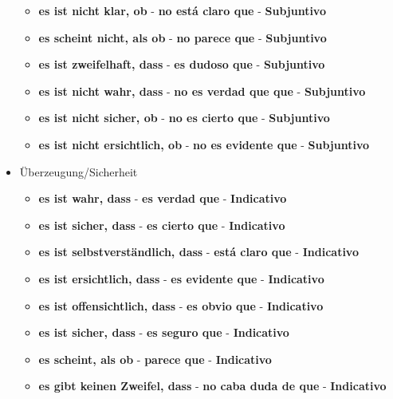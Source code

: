 \documentclass{article}
\begin{document}
\begin{multicols}{2}
\begin{itemize}
\begin{itemize}
			\item{\textbf{es ist nicht klar, ob} - \textbf{no está claro que} - \textbf{Subjuntivo}}
			\item{\textbf{es scheint nicht, als ob} - \textbf{no parece que} - \textbf{Subjuntivo}}
			\item{\textbf{es ist zweifelhaft, dass} - \textbf{es dudoso que} - \textbf{Subjuntivo}}
			\item{\textbf{es ist nicht wahr, dass} - \textbf{no es verdad que que} - \textbf{Subjuntivo}}
			\item{\textbf{es ist nicht sicher, ob} - \textbf{no es cierto que} - \textbf{Subjuntivo}}
			\item{\textbf{es ist nicht ersichtlich, ob} - \textbf{no es evidente que} - \textbf{Subjuntivo}}

		\end{itemize}
		\item{Überzeugung/Sicherheit}
		\begin{itemize}
			\item{\textbf{es ist wahr, dass} - \textbf{es verdad que} - \textbf{Indicativo}}
			\item{\textbf{es ist sicher, dass} - \textbf{es cierto que} - \textbf{Indicativo}}
			\item{\textbf{es ist selbstverständlich, dass} - \textbf{está claro que} - \textbf{Indicativo}}
			\item{\textbf{es ist ersichtlich, dass} - \textbf{es evidente que} - \textbf{Indicativo}}
			\item{\textbf{es ist offensichtlich, dass} - \textbf{es obvio que} - \textbf{Indicativo}}
			\item{\textbf{es ist sicher, dass} - \textbf{es seguro que} - \textbf{Indicativo}}
			\item{\textbf{es scheint, als ob} - \textbf{parece que} - \textbf{Indicativo}}
			\item{\textbf{es gibt keinen Zweifel, dass} - \textbf{no caba duda de que} - \textbf{Indicativo}}	
		\end{itemize}
	\end{itemize}
	
		\end{multicols}
	
\end{document}
